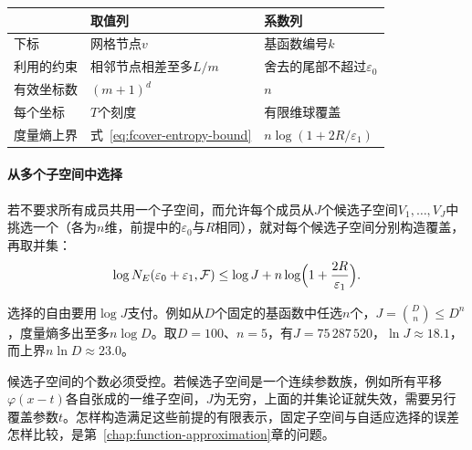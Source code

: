 \begin{BookInlineTable}
  \centering
  \begin{tabular}{@{}lll@{}}
    \toprule
    & 取值列 & 系数列\\
    \midrule
    下标 & 网格节点$v$ & 基函数编号$k$\\
    利用的约束 & 相邻节点相差至多$L/m$ & 舍去的尾部不超过$\varepsilon_0$\\
    有效坐标数 & $(m+1)^d$ & $n$\\
    每个坐标 & $T$个刻度 & 有限维球覆盖\\
    度量熵上界 & 式~\eqref{eq:fcover-entropy-bound} & $n\log(1+2R/\varepsilon_1)$\\
    \bottomrule
  \end{tabular}
  \caption{两条路线对比。两者都把函数看作一列数，都把无穷多个坐标压缩成有限个有效坐标，区别在于压缩所依据的约束。}
  \label{tab:fcover-two-lists}
\end{BookInlineTable}

\paragraph{从多个子空间中选择}

若不要求所有成员共用一个子空间，而允许每个成员从$J$个候选子空间$V_1,\ldots,V_J$中挑选一个（各为$n$维，前提中的$\varepsilon_0$与$R$相同），就对每个候选子空间分别构造覆盖，再取并集：
\begin{equation}
 \log N_E(\varepsilon_0+\varepsilon_1,\mathcal F)\leq\log J+n\log\Bigl(1+\frac{2R}{\varepsilon_1}\Bigr).
 \label{eq:fcover-many-subspaces}
\end{equation}

选择的自由要用$\log J$支付。例如从$D$个固定的基函数中任选$n$个，$J=\binom Dn\leq D^n$，度量熵多出至多$n\log D$。取$D=100$、$n=5$，有$J=75\,287\,520$，$\ln J\approx18.1$，而上界$n\ln D\approx23.0$。

候选子空间的个数必须受控。若候选子空间是一个连续参数族，例如所有平移$\varphi(x-t)$各自张成的一维子空间，$J$为无穷，上面的并集论证就失效，需要另行覆盖参数$t$。怎样构造满足这些前提的有限表示，固定子空间与自适应选择的误差怎样比较，是第~\ref{chap:function-approximation}章的问题。
